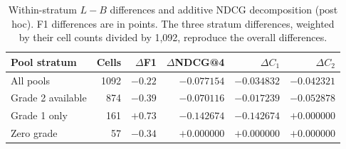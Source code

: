 \begin{table}[htbp]\centering\small
\caption{Within-stratum $L-B$ differences and additive NDCG decomposition (post hoc). F1 differences are in points. The three stratum differences, weighted by their cell counts divided by 1,092, reproduce the overall differences.}\label{tab:dcgparts2}
\begin{tabular}{lrrrrr}\toprule
Pool stratum & Cells & $\Delta$F1 & $\Delta$NDCG@4 & $\Delta C_1$ & $\Delta C_2$\\\midrule
All pools & 1092 & $-0.22$ & $-0.077154$ & $-0.034832$ & $-0.042321$\\
Grade 2 available & 874 & $-0.39$ & $-0.070116$ & $-0.017239$ & $-0.052878$\\
Grade 1 only & 161 & $+0.73$ & $-0.142674$ & $-0.142674$ & $+0.000000$\\
Zero grade & 57 & $-0.34$ & $+0.000000$ & $+0.000000$ & $+0.000000$\\
\bottomrule\end{tabular}\end{table}
